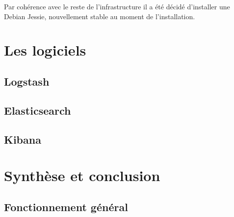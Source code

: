 \documentclass[a4paper,12pt,one side,titlepage]{report}
\begin{document}
Par cohérence avec le reste de l'infrastructure il a été décidé d'installer une 
Debian Jessie, nouvellement stable au moment de l'installation.
%
%
%
%

\part{Les logiciels}
\chapter{Logstash}


\chapter{Elasticsearch}


\chapter{Kibana}


\part{Synthèse et conclusion}
\chapter{Fonctionnement général}
\end{document}
